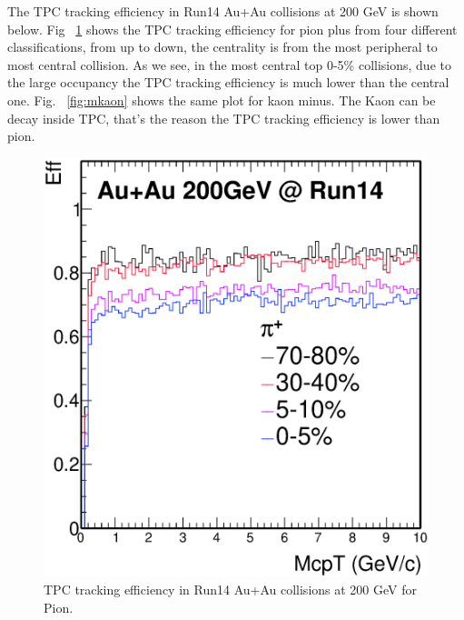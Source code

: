 The TPC tracking efficiency in Run14 Au+Au collisions at 200 GeV is shown below. Fig ~\ref{fig:mpion} shows the TPC tracking efficiency for pion plus from four different classifications, from up to down, the centrality is from the most peripheral to most central collision. As we see, in the most central top 0-5\% collisions, due to the large occupancy the TPC tracking efficiency is much lower than the central one. Fig. ~\ref{fig:mkaon} shows the same plot for kaon minus. The Kaon can be decay inside TPC, that's the reason the TPC tracking efficiency is lower than pion.

\begin{figure}[htbp]
\begin{minipage}[htbp]{0.52\linewidth}
\centering
\includegraphics[width=1.0\textwidth]{figure/Run14_D0HFT/pion.eps}
\caption{TPC tracking efficiency in Run14 Au+Au collisions at 200 GeV for Pion. \label{fig:mpion}}
\end{minipage}
\hfill
\begin{minipage}[htbp]{0.52\linewidth}
\centering

\end{minipage}
\end{figure}
